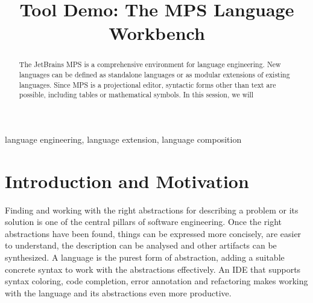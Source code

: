 \documentclass[10pt, conference, compsocconf]{IEEEtran}
\begin{document}
%
\title{Tool Demo: The MPS Language Workbench}



\author{
\and
{}
}

\newcommand\todo[1]{\mynote{TODO}{#1}} 
\newcommand{\fig}[1]{Fig.~\ref{#1}}
\newcommand{\sect}[1]{Section~\ref{#1}}
\newcommand{\ic}[1]{\changefont{cmtt}{m}{n}{#1}\normalfont}  %
\newcommand{\lcr}[1]{\changefont{cmtt}{m}{n}{#1}\normalfont} %


\maketitle


\begin{abstract}
The JetBrains MPS is a comprehensive environment for language engineering.
New languages can be defined as standalone languages or as modular extensions of
existing languages. Since MPS is a projectional editor, syntactic forms other
than text are possible, including tables or mathematical symbols. In this
session, we will \todo{}
\end{abstract}

\begin{IEEEkeywords}
language engineering, language extension, language composition
\end{IEEEkeywords}

\section{Introduction and Motivation}

\noindent
Finding and working with the right abstractions for describing a
problem or its solution is one of the central pillars of software engineering.
Once the right abstractions have been found, things can be expressed more
concisely, are easier to understand, the description can be analysed and other
artifacts can be synthesized. A language is the purest form of abstraction,
adding a suitable concrete syntax to work with the abstractions effectively. An
IDE that supports syntax coloring, code completion, error annotation and
refactoring makes working with the language and its abstractions even more
productive.
\end{document}
